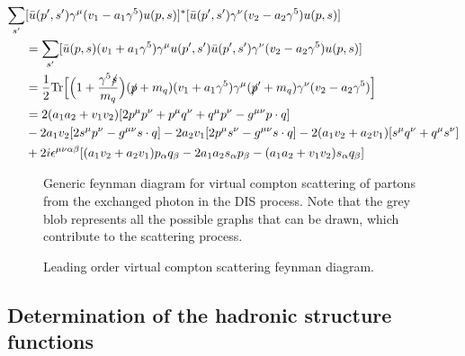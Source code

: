 \documentclass[aps,prd,amsmath,superscriptaddress,floatfix,nofootinbib]{revtex4-2}
\begin{document}
\begin{eqnarray}
    \label{eq:generic-tensor-structure}
    \begin{aligned} 
        \sum_{s'} &[ \bar{u}(p',s') \gamma^{\mu} (v_1 - a_1 \gamma^{5}) u(p,s) ]^{*}[ \bar{u}(p',s') \gamma^{\nu} (v_2 - a_2 \gamma^{5}) u(p,s) ] \\
                  &= \sum_{s'} [ \bar{u}(p,s) (v_1 + a_1 \gamma^{5}) \gamma^{\mu} u(p',s') \bar{u}(p',s') \gamma^{\nu} (v_2 - a_2 \gamma^{5}) u(p,s) ] \\
                  &= \frac{1}{2}{\rm Tr} \Big[ \Big( 1 + \frac{\gamma^{5} \slashed{s}}{m_{q}} \Big) ( \slashed{p} + m_{q} ) ( v_1 + a_1 \gamma^{5} ) \gamma^{\mu} (\slashed{p}' + m_{q} ) \gamma^{\nu} ( v_2 - a_2 \gamma^{5} ) \Big] \\
                  &= 2 ( a_1 a_2 + v_1v_2 )[ 2 p^{\mu}p^{\nu} + p^{\mu}q^{\nu} + q^{\mu}p^{\nu}  - g^{\mu\nu} p \cdot q ] \\
                  &- 2 a_1v_2 [ 2s^{\mu}p^{\nu} - g^{\mu\nu} s \cdot q ] - 2 a_2v_1 [ 2p^{\mu}s^{\nu} - g^{\mu\nu} s \cdot q ] - 2 ( a_1v_2 + a_2v_1 ) [ s^{\mu}q^{\nu} + q^{\mu}s^{\nu} ] \\
                  &+ 2i\epsilon^{\mu\nu\alpha\beta} [ ( a_1v_2 + a_2v_1 ) p_{\alpha}q_{\beta} - 2 a_1a_2 s_{\alpha}p_{\beta} - ( a_1a_2 + v_1v_2 ) s_{\alpha}q_{\beta} ]
    \end{aligned}
\end{eqnarray}


\begin{figure}[h!tb]
\begin{center} 
    \caption{Generic feynman diagram for virtual compton scattering of partons from the exchanged photon in the DIS process. Note that the grey blob represents all the possible graphs that can be drawn, which contribute to the scattering process.}
    \label{fig:virtual-compton-scattering}
\end{center}
\end{figure}

\begin{figure}[h!tb]
\begin{center} 
    \caption{Leading order virtual compton scattering feynman diagram.}
    \label{fig:virtual-compton-scattering-LO}
\end{center}
\end{figure}


\subsection{Determination of the hadronic structure functions}
\label{ss:determination-of-the-hadronic-structure-functions}
\end{document}
